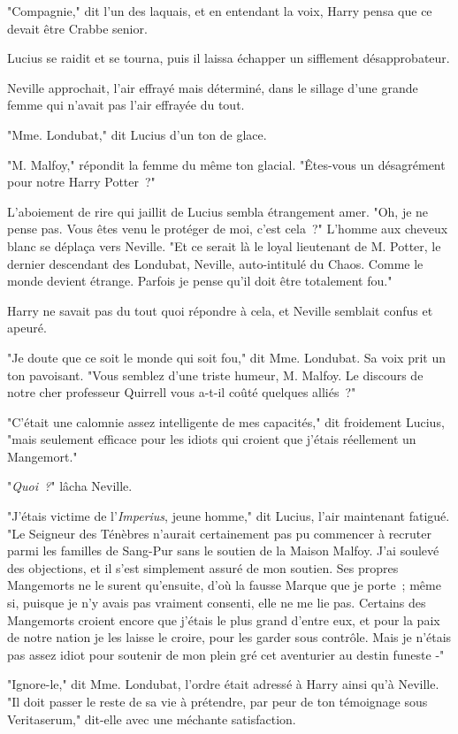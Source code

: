 "Compagnie," dit l'un des laquais, et en entendant la voix, Harry pensa que ce devait être Crabbe senior.

Lucius se raidit et se tourna, puis il laissa échapper un sifflement désapprobateur.

Neville approchait, l'air effrayé mais déterminé, dans le sillage d'une grande femme qui n'avait pas l'air effrayée du tout.

"Mme. Londubat," dit Lucius d'un ton de glace.

"M. Malfoy," répondit la femme du même ton glacial. "Êtes-vous un désagrément pour notre Harry Potter~?"

L'aboiement de rire qui jaillit de Lucius sembla étrangement amer. "Oh, je ne pense pas. Vous êtes venu le protéger de moi, c'est cela~?" L'homme aux cheveux blanc se déplaça vers Neville. "Et ce serait là le loyal lieutenant de M. Potter, le dernier descendant des Londubat, Neville, auto-intitulé du Chaos. Comme le monde devient étrange. Parfois je pense qu'il doit être totalement fou."

Harry ne savait pas du tout quoi répondre à cela, et Neville semblait confus et apeuré.

"Je doute que ce soit le monde qui soit fou," dit Mme. Londubat. Sa voix prit un ton pavoisant. "Vous semblez d'une triste humeur, M. Malfoy. Le discours de notre cher professeur Quirrell vous a-t-il coûté quelques alliés~?"

"C'était une calomnie assez intelligente de mes capacités," dit froidement Lucius, "mais seulement efficace pour les idiots qui croient que j'étais réellement un Mangemort."

"\emph{Quoi~?}" lâcha Neville.

"J'étais victime de l'\emph{Imperius}, jeune homme," dit Lucius, l'air maintenant fatigué. "Le Seigneur des Ténèbres n'aurait certainement pas pu commencer à recruter parmi les familles de Sang-Pur sans le soutien de la Maison Malfoy. J'ai soulevé des objections, et il s'est simplement assuré de mon soutien. Ses propres Mangemorts ne le surent qu'ensuite, d'où la fausse Marque que je porte~; même si, puisque je n'y avais pas vraiment consenti, elle ne me lie pas. Certains des Mangemorts croient encore que j'étais le plus grand d'entre eux, et pour la paix de notre nation je les laisse le croire, pour les garder sous contrôle. Mais je n'étais pas assez idiot pour soutenir de mon plein gré cet aventurier au destin funeste -"

"Ignore-le," dit Mme. Londubat, l'ordre était adressé à Harry ainsi qu'à Neville. "Il doit passer le reste de sa vie à prétendre, par peur de ton témoignage sous Veritaserum," dit-elle avec une méchante satisfaction.

